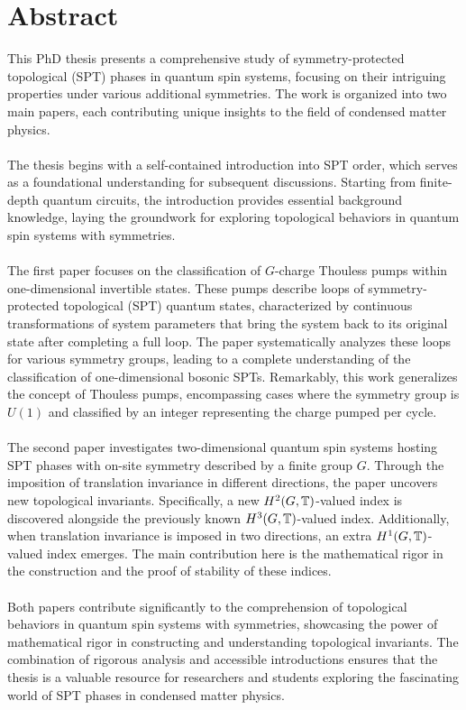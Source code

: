\chapter{Abstract}                                 \label{ch:abstract}

This PhD thesis presents a comprehensive study of symmetry-protected topological (SPT) phases in quantum spin systems, focusing on their intriguing properties under various additional symmetries. The work is organized into two main papers, each contributing unique insights to the field of condensed matter physics.
\\\\
The thesis begins with a self-contained introduction into SPT order, which serves as a foundational understanding for subsequent discussions. Starting from finite-depth quantum circuits, the introduction provides essential background knowledge, laying the groundwork for exploring topological behaviors in quantum spin systems with symmetries.
\\\\
The first paper focuses on the classification of $G$-charge Thouless pumps within one-dimensional invertible states. These pumps describe loops of symmetry-protected topological (SPT) quantum states, characterized by continuous transformations of system parameters that bring the system back to its original state after completing a full loop. The paper systematically analyzes these loops for various symmetry groups, leading to a complete understanding of the classification of one-dimensional bosonic SPTs. Remarkably, this work generalizes the concept of Thouless pumps, encompassing cases where the symmetry group is $U(1)$ and classified by an integer representing the charge pumped per cycle.
\\\\
The second paper investigates two-dimensional quantum spin systems hosting SPT phases with on-site symmetry described by a finite group $G$. Through the imposition of translation invariance in different directions, the paper uncovers new topological invariants. Specifically, a new $H^2(G,\mathbb T)$-valued index is discovered alongside the previously known $H^3(G,\mathbb T)$-valued index. Additionally, when translation invariance is imposed in two directions, an extra $H^1(G,\mathbb T)$-valued index emerges. The main contribution here is the mathematical rigor in the construction and the proof of stability of these indices.
\\\\
Both papers contribute significantly to the comprehension of topological behaviors in quantum spin systems with symmetries, showcasing the power of mathematical rigor in constructing and understanding topological invariants. The combination of rigorous analysis and accessible introductions ensures that the thesis is a valuable resource for researchers and students exploring the fascinating world of SPT phases in condensed matter physics.




\cleardoublepage

